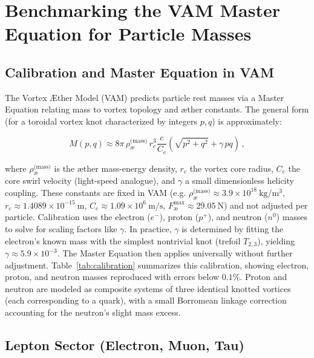 \section{Benchmarking the VAM Master Equation for Particle Masses}

\subsection{Calibration and Master Equation in VAM}

The Vortex Æther Model (VAM) predicts particle rest masses via a Master Equation relating mass to vortex topology and æther constants. The general form (for a toroidal vortex knot characterized by integers $p,q$) is approximately:

\[
    M(p,q) \approx 8\pi \,\rho_{\text{\ae}}^{\text{(mass)}} \, r_c^3 \frac{c}{C_e} \left( \sqrt{p^2 + q^2} + \gamma \, p q \right) \,,
\]

where $\rho_{\text{\ae}}^{\text{(mass)}}$ is the æther mass-energy density, $r_c$ the vortex core radius, $C_e$ the core swirl velocity (light-speed analogue), and $\gamma$ a small dimensionless helicity coupling. These constants are fixed in VAM (e.g. $\rho_{\text{\ae}}^{\text{(mass)}} \approx 3.9 \times 10^{18}~\mathrm{kg/m^3}$, $r_c \approx 1.4089 \times 10^{-15}~\mathrm{m}$, $C_e \approx 1.09 \times 10^6~\mathrm{m/s}$, $F^{\max}_{\text{\ae}} \approx 29.05~\mathrm{N}$) and not adjusted per particle. Calibration uses the electron ($e^-$), proton ($p^+$), and neutron ($n^0$) masses to solve for scaling factors like $\gamma$. In practice, $\gamma$ is determined by fitting the electron’s known mass with the simplest nontrivial knot (trefoil $T_{2,3}$), yielding $\gamma \approx 5.9 \times 10^{-3}$. The Master Equation then applies universally without further adjustment. Table~\ref{tab:calibration} summarizes this calibration, showing electron, proton, and neutron masses reproduced with errors below $0.1\%$. Proton and neutron are modeled as composite systems of three identical knotted vortices (each corresponding to a quark), with a small Borromean linkage correction accounting for the neutron’s slight mass excess.

\subsection{Lepton Sector (Electron, Muon, Tau)}

